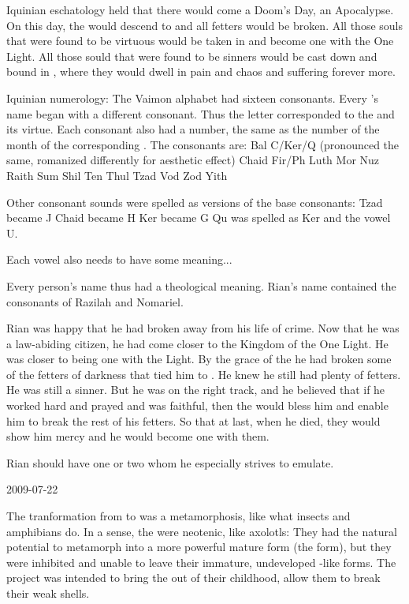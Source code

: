   Iquinian eschatology held that there would come a Doom's Day, an Apocalypse.
  On this day, the \sephiroth would descend to \Miith and all fetters would be broken. 
  All those souls that were found to be virtuous would be taken in and become one with the One Light.
  All those sould that were found to be sinners would be cast down and bound in \itzach, where they would dwell in pain and chaos and suffering forever more. 

Iquinian numerology:
  The Vaimon alphabet had sixteen consonants.
  Every \sephirah's name began with a different consonant. 
  Thus the letter corresponded to the \sephirah and its virtue. 
  Each consonant also had a number, the same as the number of the month of the corresponding \sephirah.
  The consonants are: 
    Bal
    C/Ker/Q (pronounced the same, romanized differently for aesthetic effect)
    Chaid
    Fir/Ph
    Luth
    Mor
    Nuz
    Raith
    Sum
    Shil
    Ten
    Thul
    Tzad
    Vod
    Zod
    Yith
    
    Other consonant sounds were spelled as  versions of the base consonants:
      Tzad became J
      Chaid became H
      Ker became G
    Qu was spelled as Ker and the vowel U.
  
  Each vowel also needs to have some meaning...
  
  Every person's name thus had a theological meaning. 
  Rian's name contained the consonants of Razilah and Nomariel.
  

Rian was happy that he had broken away from his life of crime. 
Now that he was a law-abiding citizen, he had come closer to the Kingdom of the One Light.
He was closer to being one with the Light. 
By the grace of the \sephiroth he had broken some of the fetters of darkness that tied him to \Itzach.
He knew he still had plenty of fetters. 
He was still a sinner.
But he was on the right track, and he believed that if he worked hard and prayed and was faithful, then the \sephiroth would bless him and enable him to break the rest of his fetters.
So that at last, when he died, they would show him mercy and he would become one with them.

Rian should have one or two \sephiroth whom he especially strives to emulate. 



2009-07-22

The tranformation from \resphan to \neoresphan was a metamorphosis, like what insects and amphibians do. 
In a sense, the \resphain were neotenic, like axolotls: 
They had the natural potential to metamorph into a more powerful mature form (the \neoresphan form), but they were inhibited and unable to leave their immature, undeveloped \human-like forms. 
The \neoresphan project was intended to bring the \resphain out of their childhood, allow them to break their weak shells.

